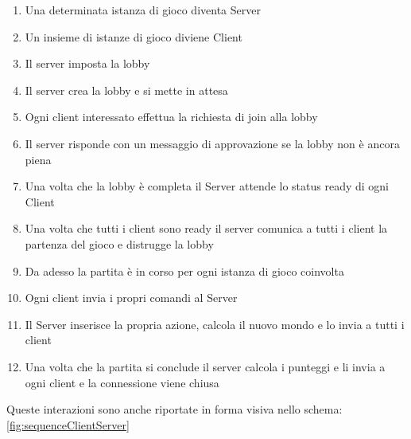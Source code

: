 \begin{enumerate}
    \item Una determinata istanza di gioco diventa Server
    \item Un insieme di istanze di gioco diviene Client
    \item Il server imposta la lobby
    \item Il server crea la lobby e si mette in attesa
    \item Ogni client interessato effettua la richiesta di join alla lobby
    \item Il server risponde con un messaggio di approvazione se la lobby non è ancora piena
    \item Una volta che la lobby è completa il Server attende lo status ready di ogni Client
    \item Una volta che tutti i client sono ready il server comunica a tutti i client la partenza del gioco e distrugge la lobby
    \item Da adesso la partita è in corso per ogni istanza di gioco coinvolta
    \item Ogni client invia i propri comandi al Server
    \item Il Server inserisce la propria azione, calcola il nuovo mondo e lo invia a tutti i client
    \item Una volta che la partita si conclude il server calcola i punteggi e li invia a ogni client e la connessione viene chiusa
\end{enumerate}

Queste interazioni sono anche riportate in forma visiva nello schema: \ref{fig:sequenceClientServer}

